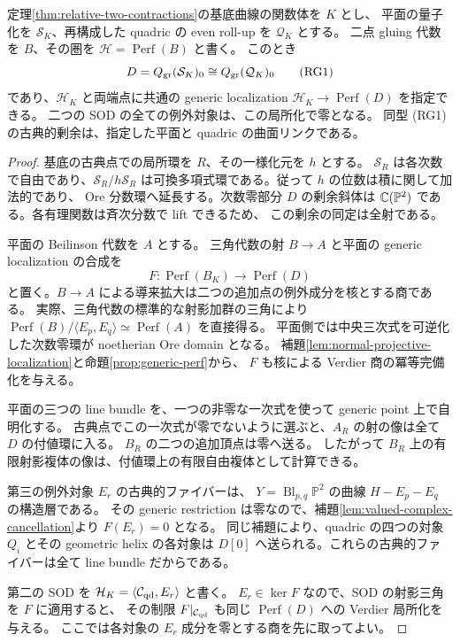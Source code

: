 \begin{proposition}\label{prop:relative-common-field}
定理\ref{thm:relative-two-contractions}の基底曲線の関数体を $K$ とし、
平面の量子化を $\mathcal S_K$、再構成した quadric の even roll-up を $\mathcal Q_K$ とする。
二点 gluing 代数を $B$、その圏を $\mathcal H=\operatorname{Perf}(B)$ と書く。
このとき
\[
 D=Q_{\rm gr}(\mathcal S_K)_0
 \cong Q_{\rm gr}(\mathcal Q_K)_0
 \tag{RG1}
\]
であり、$\mathcal H_K$ と両端点に共通の generic localization
$\mathcal H_K\to\operatorname{Perf}(D)$ を指定できる。
二つの SOD の全ての例外対象は、この局所化で零となる。
同型 (RG1) の古典的剰余は、指定した平面と quadric の曲面リンクである。
\end{proposition}
\begin{proof}
基底の古典点での局所環を $R$、その一様化元を $h$ とする。
$\mathcal S_R$ は各次数で自由であり、$\mathcal S_R/h\mathcal S_R$
は可換多項式環である。従って $h$ の位数は積に関して加法的であり、
Ore 分数環へ延長する。次数零部分 $D$ の剰余斜体は
$\mathbb C(\mathbb P^2)$ である。各有理関数は斉次分数で lift できるため、
この剰余の同定は全射である。

平面の Beilinson 代数を $A$ とする。
三角代数の射 $B\to A$ と平面の generic localization の合成を
\[
 F:\operatorname{Perf}(B_K)\longrightarrow\operatorname{Perf}(D)
 \tag{RG2}
\]
と置く。$B\to A$ による導来拡大は二つの追加点の例外成分を核とする商である。
実際、三角代数の標準的な射影加群の三角により
$\operatorname{Perf}(B)/\langle E_p,E_q\rangle\simeq\operatorname{Perf}(A)$
を直接得る。
平面側では中央三次式を可逆化した次数零環が noetherian Ore domain となる。
補題\ref{lem:normal-projective-localization}と命題\ref{prop:generic-perf}から、
$F$ も核による Verdier 商の冪等完備化を与える。

平面の三つの line bundle を、一つの非零な一次式を使って generic point 上で自明化する。
古典点でこの一次式が零でないように選ぶと、$A_R$ の射の像は全て $D$ の付値環に入る。
$B_R$ の二つの追加頂点は零へ送る。
したがって $B_R$ 上の有限射影複体の像は、付値環上の有限自由複体として計算できる。

第三の例外対象 $E_r$ の古典的ファイバーは、
$Y=\operatorname{Bl}_{p,q}\mathbb P^2$ の曲線 $H-E_p-E_q$ の構造層である。
その generic restriction は零なので、補題\ref{lem:valued-complex-cancellation}より
$F(E_r)=0$ となる。
同じ補題により、quadric の四つの対象 $Q_i$ とその geometric helix の各対象は
$D[0]$ へ送られる。これらの古典的ファイバーは全て line bundle だからである。

第二の SOD を $\mathcal H_K=\langle\mathcal C_{\rm qd},E_r\rangle$ と書く。
$E_r\in\ker F$ なので、SOD の射影三角を $F$ に適用すると、
その制限 $F|_{\mathcal C_{\rm qd}}$ も同じ $\operatorname{Perf}(D)$ への Verdier 局所化を与える。
ここでは各対象の $E_r$ 成分を零とする商を先に取ってよい。


\end{proof}
